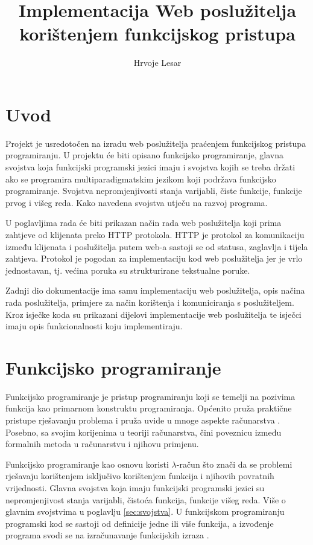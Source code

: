\documentclass[]{foi}
\title{Implementacija Web poslužitelja korištenjem funkcijskog pristupa}
\author{Hrvoje Lesar}
\begin{document}
\maketitle

\tableofcontents

\makeatletter {} \makeatother
\pagestyle{plain}

\chapter{Uvod}

Projekt je usredotočen na izradu web poslužitelja praćenjem funkcijskog pristupa programiranju.
U projektu će biti opisano funkcijsko programiranje, glavna svojstva koja funkcijski programski
jezici imaju i svojstva kojih se treba držati ako se programira multiparadigmatskim jezikom
koji podržava funkcijsko programiranje. Svojstva nepromjenjivosti stanja varijabli, čiste funkcije,
funkcije prvog i višeg reda. Kako navedena svojstva utječu na razvoj programa.

U poglavljima rada će biti prikazan način rada web poslužitelja koji prima zahtjeve od klijenata
preko HTTP protokola. HTTP je protokol za komunikaciju između klijenata i poslužitelja putem web-a
sastoji se od statusa, zaglavlja i tijela zahtjeva. Protokol je pogodan za implementaciju kod
web poslužitelja jer je vrlo jednostavan, tj. većina poruka su strukturirane tekstualne poruke.

Zadnji dio dokumentacije ima samu implementaciju web poslužitelja, opis načina rada poslužitelja,
primjere za način korištenja i komuniciranja s poslužiteljem. Kroz isječke koda su prikazani
dijelovi implementacije web poslužitelja te isječci imaju opis funkcionalnosti koju implementiraju.

\chapter{Funkcijsko programiranje}

Funkcijsko programiranje je pristup programiranju koji se temelji na pozivima funkcija kao primarnom konstruktu programiranja.
Općenito pruža praktične pristupe rješavanju problema i pruža uvide u mnoge aspekte računarstva \cite{michaelson2011introduction}.
Posebno, sa svojim korijenima u teoriji računarstva, čini poveznicu između formalnih metoda u računarstvu i njihovu primjenu.

Funkcijsko programiranje kao osnovu koristi $\lambda$-račun što znači da se problemi rješavaju korištenjem
isključivo korištenjem funkcija i njihovih povratnih vrijednosti. Glavna svojstva koja imaju funkcijski
programski jezici su nepromjenjivost stanja varijabli, čistoća funkcija, funkcije višeg reda. Više o glavnim svojstvima
u poglavlju \ref{sec:svojstva}. U funkcijskom programiranju programski kod se sastoji od definicije jedne
ili više funkcija, a izvođenje programa svodi se na izračunavanje funkcijskih izraza \cite{rovzic2016lambda}.
\end{document}
